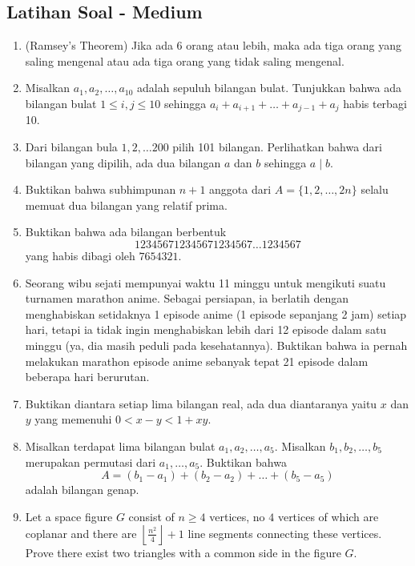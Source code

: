 \documentclass[12pt]{scrartcl}
\begin{document}
\subsection{Latihan Soal - Medium}
\begin{enumerate}
    \item (Ramsey's Theorem) Jika ada 6 orang atau lebih, maka ada tiga orang yang saling mengenal atau ada tiga orang yang tidak saling mengenal.

    \item Misalkan $a_1, a_2, \dots, a_{10}$ adalah sepuluh bilangan bulat. Tunjukkan bahwa ada bilangan bulat $1 \le i,j \le 10$ sehingga $a_i+a_{i+1}+\dots+a_{j-1}+a_j$ habis terbagi 10.

    \item Dari bilangan bula $1,2,\dots 200$ pilih 101 bilangan. Perlihatkan bahwa dari bilangan yang dipilih, ada dua bilangan $a$ dan $b$ sehingga $a \mid b$.

    \item Buktikan bahwa subhimpunan $n+1$ anggota dari $A=\{1,2,\dots, 2n\}$ selalu memuat dua bilangan yang relatif prima.

    \item Buktikan bahwa ada bilangan berbentuk $$123456712345671234567\dots1234567$$
    yang habis dibagi oleh $7654321$.

    \item Seorang wibu sejati mempunyai waktu 11 minggu untuk mengikuti suatu turnamen marathon anime. Sebagai persiapan, ia berlatih dengan menghabiskan setidaknya 1 episode anime (1 episode sepanjang 2 jam) setiap hari, tetapi ia tidak ingin menghabiskan lebih dari 12 episode dalam satu minggu (ya, dia masih peduli pada kesehatannya). Buktikan bahwa ia pernah melakukan marathon episode anime sebanyak tepat 21 episode dalam beberapa hari berurutan.

    \item Buktikan diantara setiap lima bilangan real, ada dua diantaranya yaitu $x$ dan $y$ yang memenuhi $0 < x-y < 1+xy$.

    \item Misalkan terdapat lima bilangan bulat $a_1, a_2, \dots, a_5$. Misalkan $b_1,b_2,\dots,b_5$ merupakan permutasi dari $a_1,\dots,a_5$. Buktikan bahwa 
    $$A=(b_1-a_1)+(b_2-a_2)+\dots+(b_5-a_5)$$ adalah bilangan genap.

    \item Let a space figure $G$ consist of $n \ge 4$ vertices, no $4$ vertices of which are coplanar and there are $\left\lfloor \frac{n^2}{4} \right\rfloor + 1$ line segments connecting these vertices. Prove there exist two triangles with a common side in the figure $G$.
    

\end{enumerate}
\end{document}
